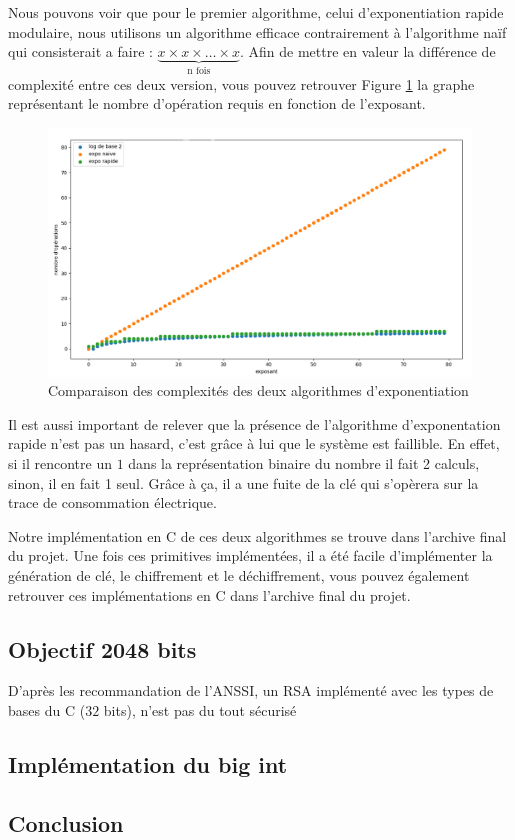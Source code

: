 Nous pouvons voir que pour le premier algorithme, celui d'exponentiation rapide modulaire, nous utilisons un algorithme efficace contrairement à l'algorithme naïf qui consisterait a faire : $\underbrace{x \times x \times \ldots \times x}_{\text{n fois}}$. Afin de mettre en valeur la différence de complexité entre ces deux version, vous pouvez retrouver Figure \ref{fig:diff_complexite} la graphe représentant le nombre d'opération requis en fonction de l'exposant.
\begin{figure}[H]
    \centering
    \includegraphics[width=\textwidth]{fig/diff_complexite.png}
    \caption{Comparaison des complexités des deux algorithmes d'exponentiation}
    \label{fig:diff_complexite}
\end{figure}
Il est aussi important de relever que la présence de l'algorithme d'exponentation rapide n'est pas un hasard, c'est grâce à lui que le système est faillible. En effet, si il rencontre un $1$ dans la représentation binaire du nombre il fait 2 calculs, sinon, il en fait 1 seul. Grâce à ça, il a une fuite de la clé qui s’opèrera sur la trace de consommation électrique.

Notre implémentation en C de ces deux algorithmes se trouve dans l'archive final du projet. Une fois ces primitives implémentées, il a été facile d'implémenter la génération de clé, le chiffrement et le déchiffrement, vous pouvez également retrouver ces implémentations en C dans l'archive final du projet.

\subsection{Objectif 2048 bits}
D'après les recommandation de l'ANSSI, un RSA implémenté avec les types de bases du C ($32$ bits), n'est pas du tout sécurisé
\subsection{Implémentation du big int}
\subsection{Conclusion}
